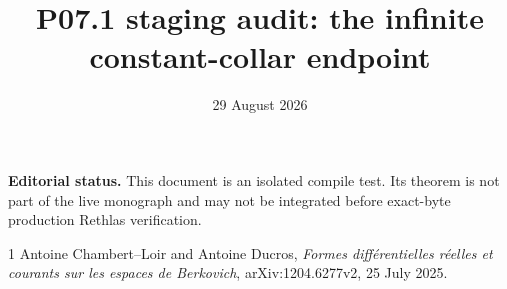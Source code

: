 \documentclass[11pt]{article}
\title{P07.1 staging audit: the infinite constant-collar endpoint}
\author{}
\date{29 August 2026}
\begin{document}
\maketitle

\noindent
\textbf{Editorial status.}
This document is an isolated compile test.  Its theorem is not part of the
live monograph and may not be integrated before exact-byte production Rethlas
verification.




\begin{thebibliography}{1}
Antoine Chambert--Loir and Antoine Ducros,
\emph{Formes diff\'erentielles r\'eelles et courants sur les espaces de
Berkovich}, arXiv:1204.6277v2, 25 July 2025.
\end{thebibliography}
\end{document}
